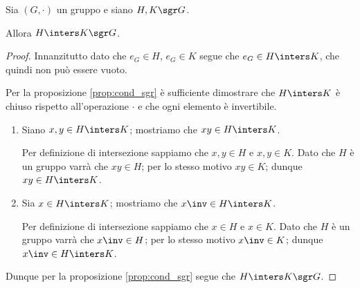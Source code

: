 \begin{proposition}
    Sia $(G, \cdot)$ un gruppo e siano $H, K \sgr G$.

    Allora $H \inters K \sgr G$.
\end{proposition}
\begin{proof}
    Innanzitutto dato che $e_G \in H$, $e_G \in K$ segue che $e_G \in H \inters K$, che quindi non può essere vuoto.

    Per la proposizione \ref{prop:cond_sgr} è sufficiente dimostrare che $H \inters K$ è chiuso rispetto all'operazione $\cdot$ e che ogni elemento è invertibile.

    \begin{enumerate}[label={(\roman*)}]
        \item Siano $x, y \in H \inters K$; mostriamo che $xy \in H \inters K$.
        
        Per definizione di intersezione sappiamo che $x, y \in H$ e $x, y \in K$. Dato che $H$ è un gruppo varrà che $xy \in H$; per lo stesso motivo $xy \in K$; dunque $xy \in H \inters K$.

        \item Sia $x \in H \inters K$; mostriamo che $x\inv \in H \inters K$.
        
        Per definizione di intersezione sappiamo che $x \in H$ e $x \in K$. Dato che $H$ è un gruppo varrà che $x\inv \in H$; per lo stesso motivo $x\inv \in K$; dunque $x\inv \in H \inters K$.
    \end{enumerate}

    Dunque per la proposizione \ref{prop:cond_sgr} segue che $H \inters K \sgr G$.
\end{proof}